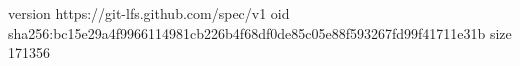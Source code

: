 version https://git-lfs.github.com/spec/v1
oid sha256:bc15e29a4f9966114981cb226b4f68df0de85c05e88f593267fd99f41711e31b
size 171356
